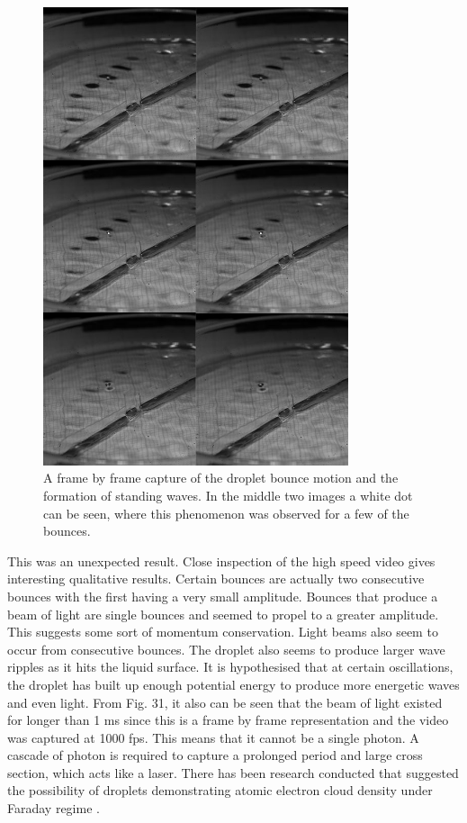 \begin{figure}[htb]
\includegraphics[width=0.8\textwidth]{prototype/exp_rep_imgs/strange_light.jpg}
\centering
\caption{A frame by frame capture of the droplet bounce motion and the formation of standing waves. In the middle two images a white dot can be seen, where this phenomenon was observed for a few of the bounces.}
\centering
\label{fig:strange_light}
\end{figure}

This was an unexpected result. Close inspection of the high speed video gives interesting qualitative results. Certain bounces are actually two consecutive bounces with the first having a very small amplitude. Bounces that produce a beam of light are single bounces and seemed to propel to a greater amplitude. This suggests some sort of momentum conservation. Light beams also seem to occur from consecutive bounces. The droplet also seems to produce larger wave ripples as it hits the liquid surface. It is hypothesised that at certain oscillations, the droplet has built up enough potential energy to produce more energetic waves and even light. From Fig. 31, it also can be seen that the beam of light existed for longer than 1 ms since this is a frame by frame representation and the video was captured at 1000 fps. This means that it cannot be a single photon. A cascade of photon is required to capture a prolonged period and large cross section, which acts like a laser. There has been research conducted that suggested the possibility of droplets demonstrating atomic electron cloud density under Faraday regime \cite{oza2013trajectory}.

